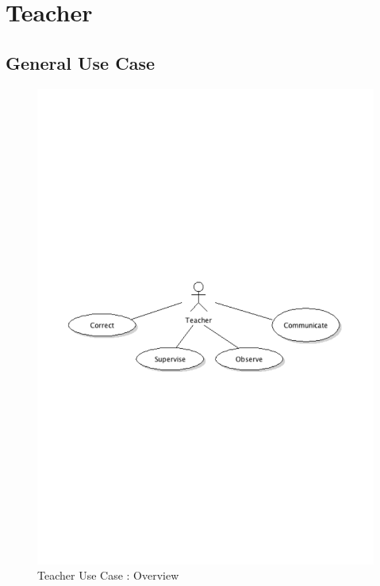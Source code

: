 \section{Teacher}
	\subsection{General Use Case}
		\begin{figure}[ht]
			\begin{center}
				\includegraphics[width=\textwidth,  trim=2cm 10cm 2cm 11cm]{UML_figure/UC/teacher/UC_Teacher_General.pdf}
				\caption{Teacher Use Case : Overview}
			\end{center}
		\end{figure}
